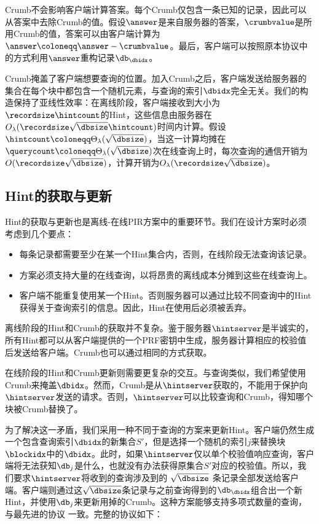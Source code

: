 Crumb不会影响客户端计算答案。每个Crumb仅包含一条已知的记录，因此可以从答案中去除Crumb的值。假设$\answer$是来自服务器的答案，$\crumbvalue$是所用Crumb的值，答案可以由客户端计算为$\answer \coloneqq \answer - \crumbvalue$。最后，客户端可以按照原本协议中的方式利用$\answer$重构记录$\db_\dbidx$。

Crumb掩盖了客户端想要查询的位置。加入Crumb之后，客户端发送给服务器的集合在每个块中都包含一个随机元素，与查询的索引$\dbidx$完全无关。我们的构造保持了亚线性效率：在离线阶段，客户端接收到大小为$\recordsize\hintcount$的Hint，这些信息由服务器在$O_\lambda(\recordsize\sqrt{\dbsize}\hintcount)$时间内计算。假设$\hintcount\coloneqq \Theta_\lambda(\sqrt{\dbsize})$，当这一计算均摊在$\querycount\coloneqq\Theta_\lambda(\sqrt{\dbsize})$次在线查询上时，每次查询的通信开销为$O(\recordsize\sqrt{\dbsize})$，计算开销为$O_\lambda(\recordsize\sqrt{\dbsize})$。

\subsection{Hint的获取与更新}
Hint的获取与更新也是离线-在线PIR方案中的重要环节。我们在设计方案时必须考虑到几个要点：
\begin{itemize}
    \item 每条记录都需要至少在某一个Hint集合内，否则，在线阶段无法查询该记录。
    \item 方案必须支持大量的在线查询，以将昂贵的离线成本分摊到这些在线查询上。
    \item 客户端不能重复使用某一个Hint。否则服务器可以通过比较不同查询中的Hint获得关于查询索引的信息。因此，Hint在使用后必须被丢弃。
\end{itemize}

离线阶段的Hint和Crumb的获取并不复杂。鉴于服务器$\hintserver$是半诚实的，所有Hint都可以从客户端提供的一个PRF密钥中生成，服务器计算相应的校验值后发送给客户端。Crumb也可以通过相同的方式获取。

在线阶段的Hint和Crumb更新则需要更复杂的交互。与查询类似，我们希望使用Crumb来掩盖$\dbidx$。然而，Crumb是从$\hintserver$获取的，不能用于保护向$\hintserver$发送的请求。否则，$\hintserver$可以比较查询和Crumb，得知哪个块被Crumb替换了。

为了解决这一矛盾，我们采用一种不同于查询的方案来更新Hint。客户端仍然生成一个包含查询索引$\dbidx$的新集合$S'$，但是选择一个随机的索引$j$来替换块$\blockidx$中的$\dbidx$。此时，如果$\hintserver$仅以单个校验值响应查询，客户端将无法获知$\db_{j}$是什么，也就没有办法获得原集合$S'$对应的校验值。所以，我们要求$\hintserver$将收到的查询涉及到的 $\sqrt{\dbsize}$ 条记录全部发送给客户端。客户端则通过这$\sqrt{\dbsize}$条记录与之前查询得到的$\db_\dbidx$组合出一个新Hint，并使用$\db_{j}$来更新用掉的Crumb。这种方案能够支持多项式数量的查询，与最先进的协议 \cite{C:LazPap23} 一致。完整的协议如下：


